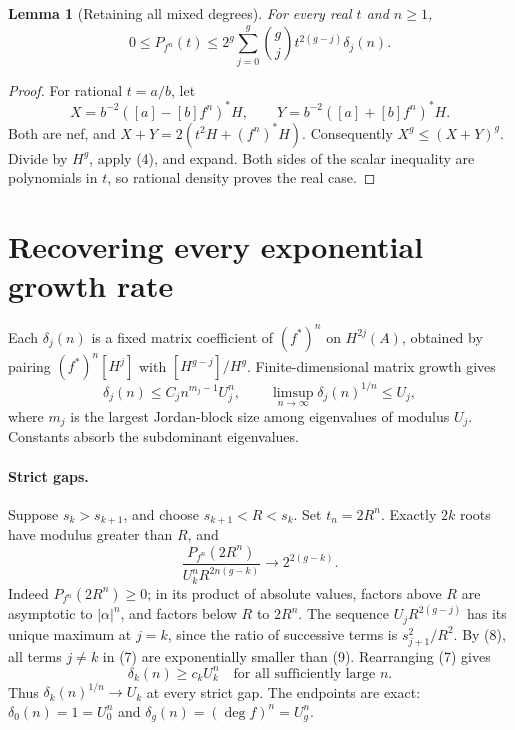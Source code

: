 \documentclass[11pt]{article}
\newtheorem{lemma}[theorem]{Lemma}
\begin{document}
\begin{lemma}[Retaining all mixed degrees]\label{mixed}
For every real \(t\) and \(n\ge1\),
\[
 0\le P_{f^n}(t)\le
 2^g\sum_{j=0}^g\binom gj t^{2(g-j)}\delta_j(n).
 \tag{7}
\]
\end{lemma}
\begin{proof}
For rational \(t=a/b\), let
\[
 X=b^{-2}([a]-[b]f^n)^*H,\qquad
 Y=b^{-2}([a]+[b]f^n)^*H.
\]
Both are nef, and \(X+Y=2(t^2H+(f^n)^*H)\).
Consequently \(X^g\le(X+Y)^g\).
Divide by \(H^g\), apply (4), and expand.
Both sides of the scalar inequality are polynomials in \(t\),
so rational density proves the real case.
\end{proof}

\section{Recovering every exponential growth rate}
Each \(\delta_j(n)\) is a fixed matrix coefficient of \((f^*)^n\) on
\(H^{2j}(A)\), obtained by pairing \((f^*)^n[H^j]\) with
\([H^{g-j}]/H^g\). Finite-dimensional matrix growth gives
\[
 \delta_j(n)\le C_j n^{m_j-1}U_j^n,\qquad
 \limsup_{n\to\infty}\delta_j(n)^{1/n}\le U_j,
 \tag{8}
\]
where \(m_j\) is the largest Jordan-block size among eigenvalues of modulus
\(U_j\). Constants absorb the subdominant eigenvalues.

\paragraph{Strict gaps.}
Suppose \(s_k>s_{k+1}\), and choose \(s_{k+1}<R<s_k\).
Set \(t_n=2R^n\). Exactly \(2k\) roots have modulus greater than \(R\), and
\[
 \frac{P_{f^n}(2R^n)}
 {U_k^nR^{2n(g-k)}}\longrightarrow 2^{2(g-k)}.
 \tag{9}
\]
Indeed \(P_{f^n}(2R^n)\ge0\); in its product of absolute values, factors
above \(R\) are asymptotic to \(|\alpha|^n\), and factors below \(R\)
to \(2R^n\).
The sequence \(U_jR^{2(g-j)}\) has its unique maximum at \(j=k\),
since the ratio of successive terms is \(s_{j+1}^2/R^2\).
By (8), all terms \(j\ne k\) in (7) are exponentially smaller than (9).
Rearranging (7) gives
\[
 \delta_k(n)\ge c_k U_k^n\quad\text{for all sufficiently large }n.
 \tag{10}
\]
Thus \(\delta_k(n)^{1/n}\to U_k\) at every strict gap.
The endpoints are exact:
\(\delta_0(n)=1=U_0^n\) and
\(\delta_g(n)=(\deg f)^n=U_g^n\).
\end{document}
